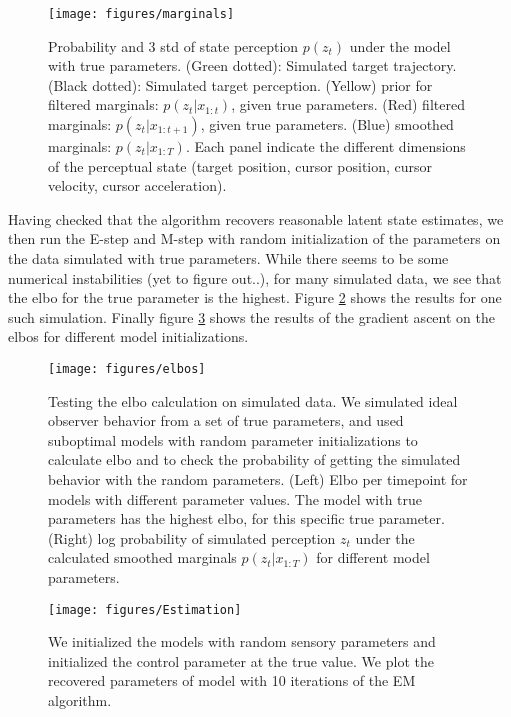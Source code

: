\documentclass[11pt, reqno]{article}
\numberwithin{equation}{section}
\begin{document}
\begin{figure} \label{marginals}
\centering
\texttt{[image: figures/marginals]}
\caption{Probability and 3 std of state perception $p(z_t )$ under the model with true parameters.  (Green dotted): Simulated target trajectory. (Black dotted): Simulated target perception. (Yellow) prior for filtered marginals: $p(z_t | x_{1:t})$, given true parameters.  (Red) filtered marginals: $p(z_t | x_{1:t+1})$, given true parameters.  (Blue) smoothed marginals: $p(z_t | x_{1:T})$.  Each panel indicate the different dimensions of the perceptual state (target position, cursor position, cursor velocity, cursor acceleration). }
\end{figure}

Having checked that the algorithm recovers reasonable latent state estimates,  we then run the E-step and M-step with random initialization of the parameters on the data simulated with true parameters.  While there seems to be some numerical instabilities (yet to figure out..), for many simulated data, we see that the elbo for the true parameter is the highest.  Figure \ref{elbos} shows the results for one such simulation. Finally figure \ref{estimation} shows the results of the gradient ascent on the elbos for different model initializations. 

\begin{figure}\label{elbos}
\centering
\texttt{[image: figures/elbos]}
\caption{Testing the elbo calculation on simulated data.  We simulated ideal observer behavior from a set of true parameters, and used suboptimal models with random parameter initializations to calculate elbo and to check the probability of getting the simulated behavior with the random parameters. (Left) Elbo per timepoint for models with different parameter values.  The model with true parameters has the highest elbo, for this specific true parameter. (Right) log probability of simulated perception $z_t$ under the calculated smoothed marginals $p(z_t| x_{1:T})$ for different model parameters.}
\end{figure}

\begin{figure}\label{estimation}
\centering
\texttt{[image: figures/Estimation]}
\caption{We initialized the models with random sensory parameters and initialized the control parameter at the true value.  We plot the recovered parameters of model with 10 iterations of the EM algorithm. }
\end{figure}
\end{document}

